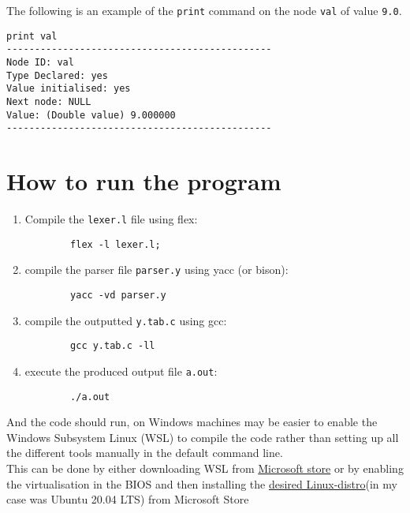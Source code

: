 \documentclass{article}
\begin{document}
The following is an example of the \verb|print| command on the node \verb|val| of value \verb|9.0|.
\begin{verbatim}
print val
-----------------------------------------------
Node ID: val
Type Declared: yes
Value initialised: yes
Next node: NULL
Value: (Double value) 9.000000
-----------------------------------------------
\end{verbatim}
\newpage
\section*{How to run the program}
\begin{enumerate}
    \item Compile the \verb|lexer.l| file using flex:     \begin{verbatim}
        flex -l lexer.l;
    \end{verbatim}
    \item compile the parser file \verb|parser.y| using yacc (or bison):
    \begin{verbatim}
        yacc -vd parser.y
    \end{verbatim}
    \item compile the outputted \verb|y.tab.c| using gcc:
    \begin{verbatim}
        gcc y.tab.c -ll
    \end{verbatim}
    \item execute the produced output file \verb|a.out|:
    \begin{verbatim}
        ./a.out
    \end{verbatim}
\end{enumerate}
And the code should run, on Windows machines may be easier to enable the Windows Subsystem Linux (WSL) to compile the code rather than setting up all the different tools manually in the default command line.\\
This can be done by either downloading WSL from \href{https://www.microsoft.com/store/productId/9P9TQF7MRM4R}{Microsoft store} or by enabling the virtualisation in the BIOS and then installing the \href{https://www.microsoft.com/store/productId/9PDXGNCFSCZV}{desired Linux-distro}(in my case was Ubuntu 20.04 LTS) from Microsoft Store
\end{document}
